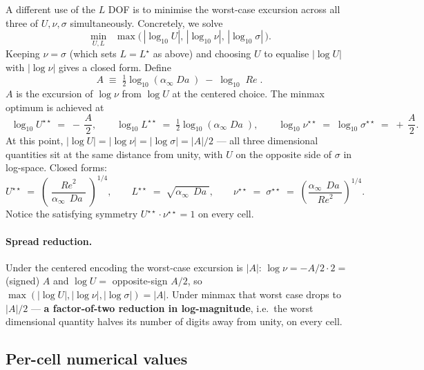 \documentclass[11pt]{article}
\newcommand{\Reyn}{\operatorname{\mathit{Re}}}
\newcommand{\Damk}{\operatorname{\mathit{Da}}}
\begin{document}
A different use of the $L$ DOF is to minimise the worst-case excursion
across all three of $U, \nu, \sigma$ simultaneously. Concretely, we
solve
\begin{equation}
  \min_{U, L}\;\; \max\!\bigl(\,|\log_{10} U|,\,|\log_{10} \nu|,\,|\log_{10} \sigma|\,\bigr).
\end{equation}
Keeping $\nu = \sigma$ (which sets $L = L^\star$ as above) and choosing
$U$ to equalise $|\log U|$ with $|\log \nu|$ gives a closed form. Define
\begin{equation}
  A \;\equiv\; \tfrac{1}{2}\log_{10}(\alpha_\infty \Damk) \;-\; \log_{10}\Reyn.
\end{equation}
$A$ is the excursion of $\log\nu$ from $\log U$ at the centered choice.
The minmax optimum is achieved at
\begin{equation}
  \boxed{\;\;
    \log_{10} U^{\star\star} \;=\; -\,\frac{A}{2},
    \qquad
    \log_{10} L^{\star\star} \;=\; \tfrac{1}{2}\log_{10}(\alpha_\infty \Damk),
    \qquad
    \log_{10}\nu^{\star\star} \;=\; \log_{10}\sigma^{\star\star} \;=\; +\,\frac{A}{2}.
  \;\;}
  \label{eq:vL-minmax}
\end{equation}
At this point, $|\log U| = |\log \nu| = |\log \sigma| = |A|/2$ — all
three dimensional quantities sit at the same distance from unity, with
$U$ on the opposite side of $\sigma$ in log-space. Closed forms:
\begin{equation}
  U^{\star\star} \;=\; \left(\frac{\Reyn^{2}}{\alpha_\infty\,\Damk}\right)^{1/4},
  \qquad
  L^{\star\star} \;=\; \sqrt{\alpha_\infty\,\Damk},
  \qquad
  \nu^{\star\star} \;=\; \sigma^{\star\star} \;=\; \left(\frac{\alpha_\infty\,\Damk}{\Reyn^{2}}\right)^{1/4}.
\end{equation}
Notice the satisfying symmetry $U^{\star\star} \cdot \nu^{\star\star} =
1$ on every cell.

\paragraph{Spread reduction.}
Under the centered encoding the worst-case excursion is $|A|$:
$\log\nu = -A/2 \cdot 2 = $ (signed) $A$ and $\log U =$ opposite-sign
$A/2$, so $\max(|\log U|,|\log\nu|,|\log\sigma|) = |A|$. Under minmax
that worst case drops to $|A|/2$ — \textbf{a factor-of-two reduction in
log-magnitude}, i.e.\ the worst dimensional quantity halves its number
of digits away from unity, on every cell.

\subsection{Per-cell numerical values}
\end{document}
